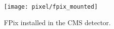 \begin{landscape}
  \begin{figure}[h]
    \centering
    \vspace{-2cm}
    \hspace{-1cm}
    \texttt{[image: pixel/fpix\_mounted]}
      \caption{FPix installed in the CMS detector.}\label{fig:fpix_mounted}
    \vspace{-1cm}
    \hspace{-2cm}
  \end{figure}
  \end{landscape}
